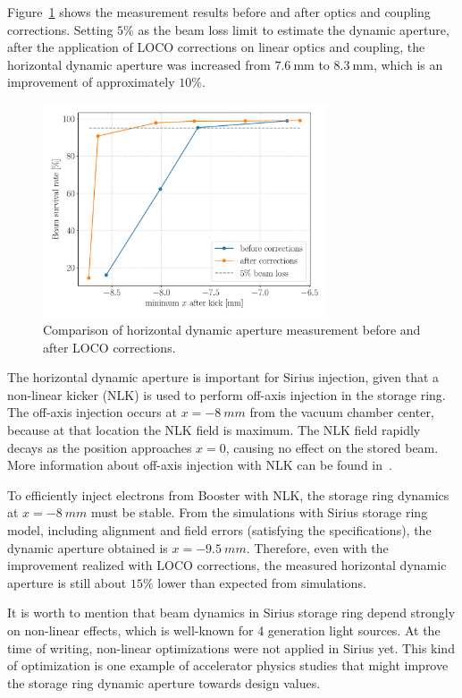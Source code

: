 Figure~\ref{fig:xdynap} shows the measurement results before and after optics and coupling corrections. Setting $5\%$ as the beam loss limit to estimate the dynamic aperture, after the application of LOCO corrections on linear optics and coupling, the horizontal dynamic aperture was increased from $\SI{7.6}{\milli\meter}$ to $\SI{8.3}{\milli\meter}$, which is an improvement of approximately $10\%$.
\begin{figure}
\centering
\includegraphics[width=0.75\textwidth]{figures/xdynamic_aperture_grid.pdf}
\caption{Comparison of horizontal dynamic aperture measurement before and after LOCO corrections.}
\label{fig:xdynap}
\end{figure}

The horizontal dynamic aperture is important for Sirius injection, given that a non-linear kicker (NLK) is used to perform off-axis injection in the storage ring. The off-axis injection occurs at $x=\SI{-8}{mm}$ from the vacuum chamber center, because at that location the NLK field is maximum. The NLK field rapidly decays as the position approaches $x=0$, causing no effect on the stored beam. More information about off-axis injection with NLK can be found in~\cite{liu2016a, wikinlk}.

To efficiently inject electrons from Booster with NLK, the storage ring dynamics at $x=\SI{-8}{mm}$ must be stable. From the simulations with Sirius storage ring model, including alignment and field errors (satisfying the specifications), the dynamic aperture obtained is $x=\SI{-9.5}{mm}$. Therefore, even with the improvement realized with LOCO corrections, the measured horizontal dynamic aperture is still about $15\%$ lower than expected from simulations. 

It is worth to mention that beam dynamics in Sirius storage ring depend strongly on non-linear effects, which is well-known for 4 generation light sources. At the time of writing, non-linear optimizations were not applied in Sirius yet. This kind of optimization is one example of accelerator physics studies that might improve the storage ring dynamic aperture towards design values.

